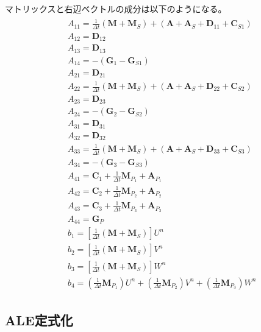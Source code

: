 マトリックスと右辺ベクトルの成分は以下のようになる。
\begin{equation}
	\begin{gathered}
		\begin{aligned} 
			&A_{11} = \frac{1}{\Delta t}\left(\bm{M}+\bm{M}_S\right)+\left(\bm{A}+\bm{A}_S+\bm{D}_{11}+\bm{C}_{S1}\right) \\ 
			&A_{12} = \bm{D}_{12} \\ 
			&A_{13} = \bm{D}_{13} \\
			&A_{14} = -\left(\bm{G}_1-\bm{G}_{S 1}\right) \\
			&A_{21} = \bm{D}_{21} \\ 
			&A_{22} = \frac{1}{\Delta t}\left(\bm{M}+\bm{M}_S\right)+\left(\bm{A}+\bm{A}_S+\bm{D}_{22}+\bm{C}_{S2}\right) \\
			&A_{23} = \bm{D}_{23} \\ 
			&A_{24} = -\left(\bm{G}_2-\bm{G}_{S 2}\right) \\
			&A_{31} = \bm{D}_{31} \\
			&A_{32} = \bm{D}_{32} \\
			&A_{33} = \frac{1}{\Delta t}\left(\bm{M}+\bm{M}_S\right)+\left(\bm{A}+\bm{A}_S+\bm{D}_{33}+\bm{C}_{S3}\right) \\
			&A_{34} = -\left(\bm{G}_3-\bm{G}_{S 3}\right) \\
			&A_{41} = \bm{C}_1+\frac{1}{\Delta t} \bm{M}_{P_1}+\bm{A}_{P_1} \\ 
			&A_{42} = \bm{C}_2+\frac{1}{\Delta t} \bm{M}_{P_2}+\bm{A}_{P_2} \\ 
			&A_{43} = \bm{C}_3+\frac{1}{\Delta t} \bm{M}_{P_3}+\bm{A}_{P_3} \\ 
			&A_{44} = \bm{G}_P \\ 
			&b_1 = \left[\frac{1}{\Delta t}\left(\bm{M}+\bm{M}_S\right)\right] U^n \\
			&b_2 = \left[\frac{1}{\Delta t}\left(\bm{M}+\bm{M}_S\right)\right] V^n \\ 
			&b_3 = \left[\frac{1}{\Delta t}\left(\bm{M}+\bm{M}_S\right)\right] W^n \\ 
			&b_4 = \left(\frac{1}{\Delta t} \bm{M}_{P_1}\right) U^n
			      +\left(\frac{1}{\Delta t} \bm{M}_{P_2}\right) V^n
			      +\left(\frac{1}{\Delta t} \bm{M}_{P_3}\right) W^n
		\end{aligned}
	\end{gathered}
\end{equation}

\subsection{ALE定式化}

